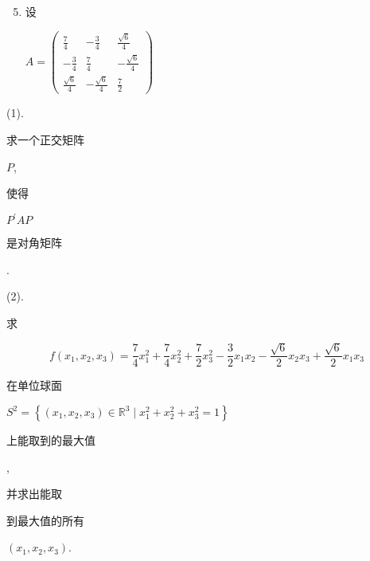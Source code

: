\documentclass[10pt]{article}
\begin{document}
\begin{enumerate}
  \setcounter{enumi}{4}
  \item \begin{CJK}{UTF8}{mj}设\end{CJK} $A=\left(\begin{array}{ccc}\frac{7}{4} & -\frac{3}{4} & \frac{\sqrt{6}}{4} \\ -\frac{3}{4} & \frac{7}{4} & -\frac{\sqrt{6}}{4} \\ \frac{\sqrt{6}}{4} & -\frac{\sqrt{6}}{4} & \frac{7}{2}\end{array}\right)$
\end{enumerate}
(1). \begin{CJK}{UTF8}{mj}求一个正交矩阵\end{CJK} $P$, \begin{CJK}{UTF8}{mj}使得\end{CJK} $P^{\prime} A P$ \begin{CJK}{UTF8}{mj}是对角矩阵\end{CJK}.

(2). \begin{CJK}{UTF8}{mj}求\end{CJK}
$$
f\left(x_{1}, x_{2}, x_{3}\right)=\frac{7}{4} x_{1}^{2}+\frac{7}{4} x_{2}^{2}+\frac{7}{2} x_{3}^{2}-\frac{3}{2} x_{1} x_{2}-\frac{\sqrt{6}}{2} x_{2} x_{3}+\frac{\sqrt{6}}{2} x_{1} x_{3}
$$
\begin{CJK}{UTF8}{mj}在单位球面\end{CJK} $S^{2}=\left\{\left(x_{1}, x_{2}, x_{3}\right) \in \mathbb{R}^{3} \mid x_{1}^{2}+x_{2}^{2}+x_{3}^{2}=1\right\}$ \begin{CJK}{UTF8}{mj}上能取到的最大值\end{CJK}, \begin{CJK}{UTF8}{mj}并求出能取\end{CJK} \begin{CJK}{UTF8}{mj}到最大值的所有\end{CJK} $\left(x_{1}, x_{2}, x_{3}\right)$.
\end{document}

